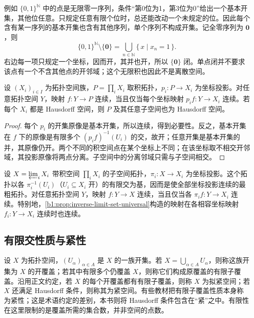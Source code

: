 \ProseParagraphBreak
例如 \(\{0,1\}^{\mathbb N}\) 中的点是无限零一序列，条件“第0位为1，第3位为0”给出一个基本开集，其他位任意。只规定任意有限个位时，总还能改动一个未规定的位。因此每个含有某一序列的基本开集也含有其他序列，单个序列不构成开集。记全零序列为 \(\mathbf 0\)，则
\[
	\{0,1\}^{\mathbb N}\setminus\{\mathbf 0\} =\bigcup_{n\in\mathbb N}\{\,x\mid x_n=1\,\}.
\]
右边每一项只规定一个坐标，因而开，其并也开，所以 \(\{\mathbf 0\}\) 闭。单点闭并不要求该点有一个不含其他点的开邻域；这个无限积也因此不是离散空间。

\begin{proposition}\label{b1:prop:product-continuity}
	设 \((X_i)_{i\in I}\) 为拓扑空间族，\(P=\prod_iX_i\) 取积拓扑，\(p_i:P\rightarrow X_i\) 为坐标投影。对任意拓扑空间 \(Y\)，映射 \(f:Y\rightarrow P\) 连续，当且仅当每个坐标映射 \(p_i f:Y\rightarrow X_i\) 连续。若每个 \(X_i\) 都是 Hausdorff 空间，则 \(P\) 及其任意子空间也为 Hausdorff 空间。
\end{proposition}

\begin{proof}
	每个 \(p_i\) 的开集原像是基本开集，所以连续，得到必要性。反之，基本开集在 \(f\) 下的原像是有限多个 \((p_i f)^{-1}(U_i)\) 的交，故开；任意开集是基本开集的并，其原像仍开。两个不同的积空间点在某个坐标上不同；在该坐标取不相交开邻域，其投影原像将两点分离。子空间中的分离邻域只需与子空间相交。
\end{proof}

设 \(X=\varprojlim_iX_i\) 带积空间 \(\prod_iX_i\) 的子空间拓扑，\(\pi_i:X\rightarrow X_i\) 为坐标投影。这个拓扑以各 \(\pi_i^{-1}(U_i)\)（\(U_i\subseteq X_i\) 开）的有限交为基，因而是使全部坐标投影连续的最粗拓扑。对任意拓扑空间 \(Y\)，映射 \(f:Y\rightarrow X\) 连续，当且仅当各 \(\pi_i f:Y\rightarrow X_i\) 连续。特别地，\cref{b1:prop:inverse-limit-set-universal}构造的映射在各相容坐标映射 \(f_i:Y\rightarrow X_i\) 连续时也连续。

\subsection{有限交性质与紧性}
\label{b1:subsec:A03:02}

设 \(X\) 为拓扑空间，\((U_\alpha)_{\alpha\in A}\) 是 \(X\) 的一族开集。若 \(X=\bigcup_{\alpha\in A}U_\alpha\)，则称这族开集为 \(X\) 的开覆盖；若其中有限多个仍覆盖 \(X\)，则称它们构成原覆盖的有限子覆盖。沿用正文约定，若 \(X\) 的每个开覆盖都有有限子覆盖，则称 \(X\) 为拟紧空间；若 \(X\) 还满足 Hausdorff 条件，则称其为紧空间。有些教材把有限子覆盖性质本身称为紧性；这是术语约定的差别，本书则将 Hausdorff 条件包含在“紧”之中。有限性在这里限制的是覆盖所需的集合数，并非空间的点数。

